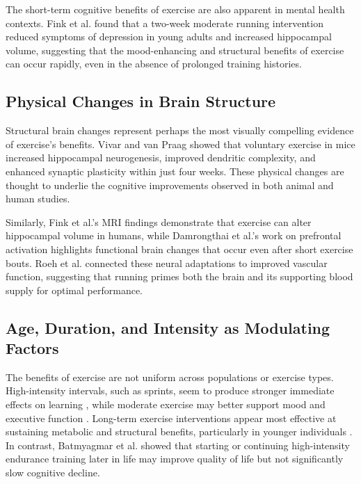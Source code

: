 \documentclass[runningheads]{llncs}
\begin{document}
The short-term cognitive benefits of exercise are also apparent in mental health contexts. Fink et al. \cite{fink2021two} found that a two-week moderate running intervention reduced symptoms of depression in young adults and increased hippocampal volume, suggesting that the mood-enhancing and structural benefits of exercise can occur rapidly, even in the absence of prolonged training histories.

\subsection{Physical Changes in Brain Structure}

Structural brain changes represent perhaps the most visually compelling evidence of exercise's benefits. Vivar and van Praag \cite{vivar2017running} showed that voluntary exercise in mice increased hippocampal neurogenesis, improved dendritic complexity, and enhanced synaptic plasticity within just four weeks. These physical changes are thought to underlie the cognitive improvements observed in both animal and human studies.

Similarly, Fink et al.’s \cite{fink2021two} MRI findings demonstrate that exercise can alter hippocampal volume in humans, while Damrongthai et al.’s \cite{damrongthai2021benefit} work on prefrontal activation highlights functional brain changes that occur even after short exercise bouts. Roeh et al. \cite{roeh2021effects} connected these neural adaptations to improved vascular function, suggesting that running primes both the brain and its supporting blood supply for optimal performance.

\subsection{Age, Duration, and Intensity as Modulating Factors}
The benefits of exercise are not uniform across populations or exercise types. High-intensity intervals, such as sprints, seem to produce stronger immediate effects on learning \cite{winter2007high}, while moderate exercise may better support mood and executive function \cite{damrongthai2021benefit}. Long-term exercise interventions appear most effective at sustaining metabolic and structural benefits, particularly in younger individuals \cite{fink2021two}. In contrast, Batmyagmar et al. \cite{batmyagmar2019high} showed that starting or continuing high-intensity endurance training later in life may improve quality of life but not significantly slow cognitive decline.
\end{document}
